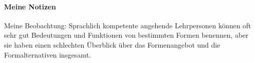 \paragraph{Meine Notizen}

Meine Beobachtung: Sprachlich kompetente angehende Lehrpersonen können oft sehr gut Bedeutungen und Funktionen von bestimmten Formen benennen, aber sie haben einen schlechten Überblick über das Formenangebot und die Formalternativen insgesamt.


















% 
% 
